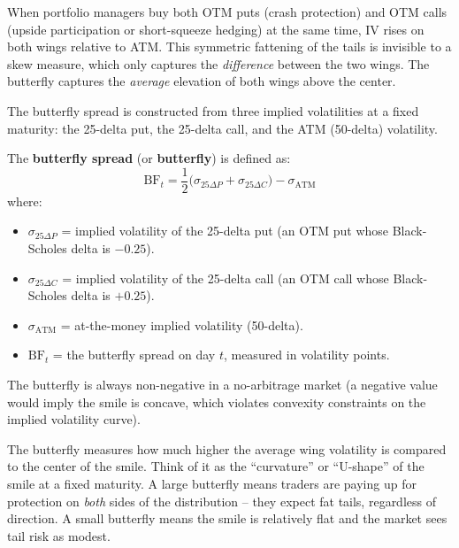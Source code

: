 When portfolio managers buy both OTM puts (crash protection) and OTM calls (upside participation or short-squeeze hedging) at the same time, IV rises on both wings relative to ATM.
This symmetric fattening of the tails is invisible to a skew measure, which only captures the \emph{difference} between the two wings.
The butterfly captures the \emph{average} elevation of both wings above the center.

The butterfly spread is constructed from three implied volatilities at a fixed maturity: the 25-delta put, the 25-delta call, and the ATM (50-delta) volatility.

\begin{definition}
\label{def:butterfly}
The \textbf{butterfly spread} (or \textbf{butterfly}) is defined as:
\begin{equation}
  \mathrm{BF}_t = \frac{1}{2}\bigl(\sigma_{25\Delta P} + \sigma_{25\Delta C}\bigr) - \sigma_{\mathrm{ATM}}
  \label{eq:butterfly}
\end{equation}
where:
\begin{itemize}[nosep]
  \item $\sigma_{25\Delta P}$ = implied volatility of the 25-delta put (an OTM put whose Black-Scholes delta is $-0.25$).
  \item $\sigma_{25\Delta C}$ = implied volatility of the 25-delta call (an OTM call whose Black-Scholes delta is $+0.25$).
  \item $\sigma_{\mathrm{ATM}}$ = at-the-money implied volatility (50-delta).
  \item $\mathrm{BF}_t$ = the butterfly spread on day $t$, measured in volatility points.
\end{itemize}
The butterfly is always non-negative in a no-arbitrage market (a negative value would imply the smile is concave, which violates convexity constraints on the implied volatility curve).
\end{definition}

\begin{intuition}
The butterfly measures how much higher the average wing volatility is compared to the center of the smile.
Think of it as the ``curvature'' or ``U-shape'' of the smile at a fixed maturity.
A large butterfly means traders are paying up for protection on \emph{both} sides of the distribution -- they expect fat tails, regardless of direction.
A small butterfly means the smile is relatively flat and the market sees tail risk as modest.
\end{intuition}

